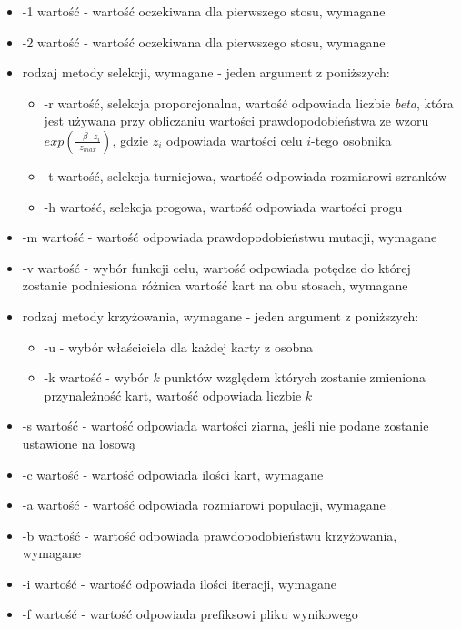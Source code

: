 \documentclass[12pt]{article}
\begin{document}
\begin{itemize}
	\item{-1 wartość - wartość oczekiwana dla pierwszego stosu, wymagane}
	\item{-2 wartość - wartość oczekiwana dla pierwszego stosu, wymagane}
	\item{rodzaj metody selekcji, wymagane - jeden argument z poniższych: 
		\begin{itemize}
			\item{-r wartość, selekcja proporcjonalna, wartość odpowiada liczbie \textit{beta}, która jest używana przy obliczaniu wartości prawdopodobieństwa ze wzoru $exp(\frac{- \beta \cdot z_i}{z_{max}})$, gdzie $z_i$ odpowiada wartości celu $i$-tego osobnika}
			\item{-t wartość, selekcja turniejowa, wartość odpowiada rozmiarowi szranków}
			\item{-h wartość, selekcja progowa, wartość odpowiada wartości progu}
		\end{itemize}
		}
	\item{-m wartość - wartość odpowiada prawdopodobieństwu mutacji, wymagane}
	\item{-v wartość - wybór funkcji celu, wartość odpowiada potędze do której zostanie podniesiona różnica wartość kart na obu stosach, wymagane }
	\item{rodzaj metody krzyżowania, wymagane - jeden argument z poniższych:
		\begin{itemize}
			\item{-u - wybór właściciela dla każdej karty z osobna}
			\item{-k wartość - wybór $k$ punktów względem których zostanie zmieniona przynależność kart, wartość odpowiada liczbie $k$} 
		\end{itemize}
		}
	\item{-s wartość - wartość odpowiada wartości ziarna, jeśli nie podane zostanie ustawione na losową}
	\item{-c wartość - wartość odpowiada ilości kart, wymagane}
	\item{-a wartość - wartość odpowiada rozmiarowi populacji, wymagane}
	\item{-b wartość - wartość odpowiada prawdopodobieństwu krzyżowania, wymagane }
	\item{-i wartość - wartość odpowiada ilości iteracji, wymagane }
	\item{-f wartość - wartość odpowiada prefiksowi pliku wynikowego}
\end{itemize}
\end{document}
